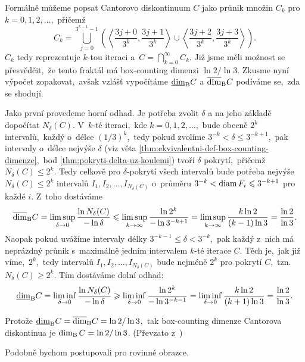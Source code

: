 \begin{example}\label{ex:cantorovo-diskontinuum}
    Formálně můžeme popsat Cantorovo diskontinuum $C$ jako průnik množin $C_k$ pro $k=0,1,2,\ldots$,~přičemž
    \[C_k=\bigcup _{j=0}^{3^{k-1}-1}\left(\left\langle{\frac {3j+0}{3^{k}}},{\frac {3j+1}{3^{k}}}\right\rangle\cup \left\langle{\frac {3j+2}{3^{k}}},{\frac {3j+3}{3^{k}}}\right\rangle\right).\]
    $C_k$ tedy reprezentuje $k$-tou iteraci a~$C=\bigcap_{k=0}^\infty C_k$. Již jsme měli možnost se přesvědčit,~že tento fraktál má box-counting dimenzi $\ln{2}/\ln{3}$. Zkusme nyní výpočet zopakovat,~avšak vzlášť vypočítáme $\underline{\dim}_\textup{B}{C}$ a $\overline{\dim}_\textup{B}{C}$ podíváme se,~zda se shodují.

    Jako první provedeme horní odhad. Je potřeba zvolit $\delta$ a na jeho základě dopočítat $N_\delta(C)$. V~$k$-té iteraci,~kde $k=0,1,2,\ldots$,~bude obecně $2^k$ intervalů,~každý o~délce $(1/3)^k$,~tedy pokud zvolíme $3^{-k}<\delta\leqslant 3^{-k+1}$,~pak intervaly o~délce nejvýše $\delta$ (viz věta \ref{thm:ekvivalentni-def-box-counting-dimenze},~bod \ref{thm:pokryti-delta-uz-koulemi}) tvoří $\delta$ pokrytí,~přičemž $N_\delta(C)\leqslant 2^k$. Tedy celkově pro $\delta$-pokrytí všech intervalů bude potřeba nejvýše $N_\delta(C)\leqslant 2^k$ intervalů $I_1,I_2,\ldots,I_{N_\delta(C)}$ o~průměru $3^{-k}<\operatorname{diam}{F_i}\leqslant 3^{-k+1}$ pro každé $i$. Z~toho dostáváme
    \[\overline{\dim}_\textup{B}{C}=\limsup_{\delta\to 0}\dfrac{\ln{N_\delta(C)}}{-\ln{\delta}}\leqslant\limsup_{k\to\infty}\dfrac{\ln{2^k}}{-\ln{3^{-k+1}}}=\limsup_{k\to\infty}\dfrac{k\ln{2}}{(k-1)\ln{3}}=\dfrac{\ln{2}}{\ln{3}}.\]
    Naopak pokud uvážíme intervaly délky $3^{-k-1}\leqslant\delta<3^{-k}$,~pak každý z~nich má neprázdný průnik s~maximálně jedním intervalem $k$-té iterace $C$. Těch je,~jak již víme,~$2^k$,~tedy intervalů $I_1,I_2,\ldots,I_{N_\delta(C)}$ bude nejméně $2^k$ pro pokrytí $C$,~tzn. $N_\delta(C)\geqslant 2^k$. Tím dostáváme dolní odhad:
    \[\underline{\dim}_\textup{B}{C}=\liminf_{\delta\to 0}\dfrac{\ln{N_\delta(C)}}{-\ln{\delta}}\geqslant\liminf_{\delta\to 0}\dfrac{\ln{2^k}}{-\ln{3^{-k-1}}}=\liminf_{\delta\to 0}\dfrac{k\ln{2}}{(k+1)\ln{3}}=\dfrac{\ln{2}}{\ln{3}}.\]

    Protože $\underline{\dim}_\textup{B}{C}=\overline{\dim}_\textup{B}{C}=\ln{2}/\ln{3}$,~tak box-counting dimenze Cantorova diskontinua je $\operatorname{dim_B}{C}=\ln{2}/\ln{3}$. (Převzato z~\citep[str. 32]{Falconer2014})
\end{example}
Podobně bychom postupovali pro rovinné obrazce.
